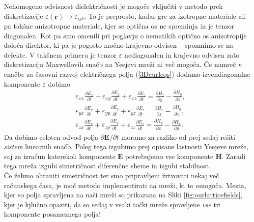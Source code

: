 \documentclass[longbibliography,slovene,a4paper,12pt]{book}
\begin{document}
Nehomogeno odvisnost dielektričnosti je mogoče vključiti v metodo prek diskretizacije $\varepsilon(\mathbf{r}) \rightarrow \varepsilon_{ijk}$. To je preprosto, kadar gre za izotropne materiale ali pa takšne anizotropne materiale, kjer se optična os ne spreminja in je tenzor diagonalen. Kot pa smo omenili pri poglavju o nematikih optično os anizotropije določa direktor, ki pa je pogosto močno krajevno odvisen -- spomnimo se na defekte. V takšnem primeru je tenzor $\varepsilon$ nediagonalen in krajevno odvisen zato diskretizacija Maxwellovih enačb na Yeejevi mreži ni več mogoča. Če namreč v enačbe za časovni razvoj električnega polja  (\ref{3Dcurleqs}) dodamo izvendiagonalne komponente $\varepsilon$ dobimo
\begin{align}
&\varepsilon_{xx} \frac{\partial E_x}{\partial t} + \varepsilon_{xy} \frac{\partial E_y}{\partial t} + \varepsilon_{xz} \frac{\partial E_z}{\partial t}= \frac{\partial H_z}{\partial y} - \frac{\partial H_y}{\partial z},\\
&\varepsilon_{yx} \frac{\partial E_x}{\partial t} + \varepsilon_{yy} \frac{\partial E_y}{\partial t} + \varepsilon_{yz} \frac{\partial E_z}{\partial t}= \frac{\partial H_x}{\partial z} - \frac{\partial H_y}{\partial x},\\ 
&\varepsilon_{zx} \frac{\partial E_x}{\partial t} + \varepsilon_{zy} \frac{\partial E_y}{\partial t} + \varepsilon_{zz} \frac{\partial E_z}{\partial t}= \frac{\partial H_y}{\partial x} - \frac{\partial H_x}{\partial y}.
\end{align}
Da dobimo celoten odvod polja $\partial \mathbf{E}/\partial t$ moramo za razliko od prej sedaj rešiti \emph{sistem} linearnih enačb. Poleg tega izgubimo prej opisane lastnosti Yeejeve mreže, saj za izračun katerekoli komponente $\mathbf{E}$ potrebujemo vse komponente $\mathbf{H}$. Zaradi tega mreža izgubi simetričnost diferenčne sheme in izgubi stabilnost\cite{werner}.\\

Če želimo ohraniti simetričnost ter smo pripravljeni žrtvovati nekaj več računskega časa, je moč metodo implementirati na mreži, ki to omogoča. Mesta, kjer so polja spravljena na naši mreži so prikazana na Sliki \ref{fig:ourlatticefields}, kjer je kjlučno opaziti, da so sedaj v vsaki točki mreže spravljene \emph{vse} tri komponente posameznega polja!
\end{document}

